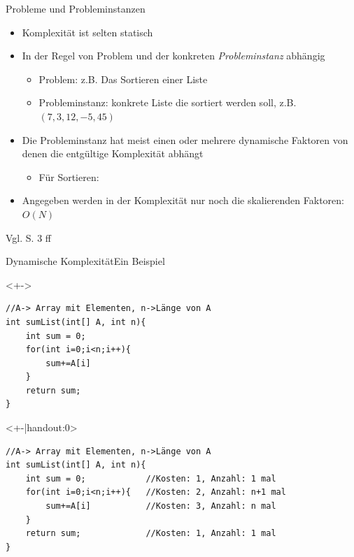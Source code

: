 \begin{frame}{Probleme und Probleminstanzen}
    \begin{itemize}[<+->]
        \item Komplexität ist selten statisch
        \item In der Regel von Problem und der konkreten \textit{Probleminstanz} abhängig
        \begin{itemize}
            \item Problem: z.B. Das Sortieren einer Liste
            \item Probleminstanz: konkrete Liste die sortiert werden soll, z.B. $(7, 3, 12, -5, 45)$
        \end{itemize}
        \item Die Probleminstanz hat meist einen oder mehrere dynamische Faktoren von denen die entgültige Komplexität abhängt
        \begin{itemize}
            \item Für Sortieren: 
        \end{itemize}
        \item Angegeben werden in der Komplexität nur noch die skalierenden Faktoren: $O(N)$
    \end{itemize}
    
    Vgl. \cite{ottmann2017} S. 3 ff
\end{frame}

\begin{frame}[fragile]{Dynamische Komplexität}{Ein Beispiel}
\lstset{style=java}
\begin{onlyenv}<+->
\begin{lstlisting}
//A-> Array mit Elementen, n->Länge von A
int sumList(int[] A, int n){
    int sum = 0;
    for(int i=0;i<n;i++){
        sum+=A[i]
    }
    return sum;
}
\end{lstlisting}
\end{onlyenv}

\begin{onlyenv}<+-|handout:0>
\begin{lstlisting}
//A-> Array mit Elementen, n->Länge von A
int sumList(int[] A, int n){
    int sum = 0;            //Kosten: 1, Anzahl: 1 mal
    for(int i=0;i<n;i++){   //Kosten: 2, Anzahl: n+1 mal
        sum+=A[i]           //Kosten: 3, Anzahl: n mal
    }
    return sum;             //Kosten: 1, Anzahl: 1 mal
}
\end{lstlisting}
\end{onlyenv}





\end{frame}

